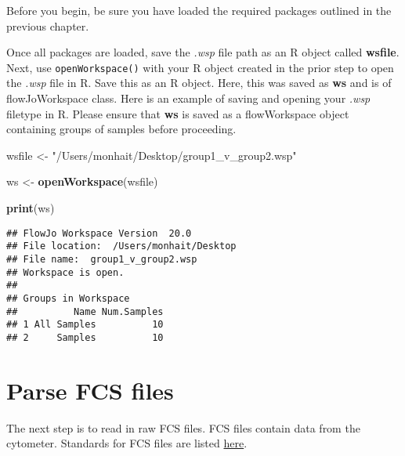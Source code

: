 \documentclass[]{book}
\newenvironment{Shaded}{\begin{snugshade}}{\end{snugshade}}
\newcommand{\KeywordTok}[1]{\textcolor[rgb]{0.13,0.29,0.53}{\textbf{#1}}}
\newcommand{\NormalTok}[1]{#1}
\newcommand{\StringTok}[1]{\textcolor[rgb]{0.31,0.60,0.02}{#1}}
\begin{document}
Before you begin, be sure you have loaded the required packages outlined in the previous chapter.

Once all packages are loaded, save the \emph{.wsp} file path as an R object called \textbf{wsfile}. Next, use \texttt{openWorkspace()} with your R object created in the prior step to open the \emph{.wsp} file in R. Save this as an R object. Here, this was saved as \textbf{ws} and is of flowJoWorkspace class. Here is an example of saving and opening your \emph{.wsp} filetype in R. Please ensure that \textbf{ws} is saved as a flowWorkspace object containing groups of samples before proceeding.

\begin{Shaded}
\begin{Highlighting}[]
\NormalTok{wsfile <-}\StringTok{ "/Users/monhait/Desktop/group1_v_group2.wsp"}
\end{Highlighting}
\end{Shaded}

\begin{Shaded}
\begin{Highlighting}[]
\NormalTok{ws <-}\StringTok{ }\KeywordTok{openWorkspace}\NormalTok{(wsfile)}
\end{Highlighting}
\end{Shaded}

\begin{Shaded}
\begin{Highlighting}[]
\KeywordTok{print}\NormalTok{(ws)}
\end{Highlighting}
\end{Shaded}

\begin{verbatim}
## FlowJo Workspace Version  20.0 
## File location:  /Users/monhait/Desktop 
## File name:  group1_v_group2.wsp 
## Workspace is open. 
## 
## Groups in Workspace
##          Name Num.Samples
## 1 All Samples          10
## 2     Samples          10
\end{verbatim}

\hypertarget{parse-fcs-files}{%
\section{Parse FCS files}\label{parse-fcs-files}}

The next step is to read in raw FCS files. FCS files contain data from the cytometer. Standards for FCS files are listed \href{http://software.broadinstitute.org/cancer/software/genepattern/attachments/fcs_3_1_standard.pdf}{here}.
\end{document}

